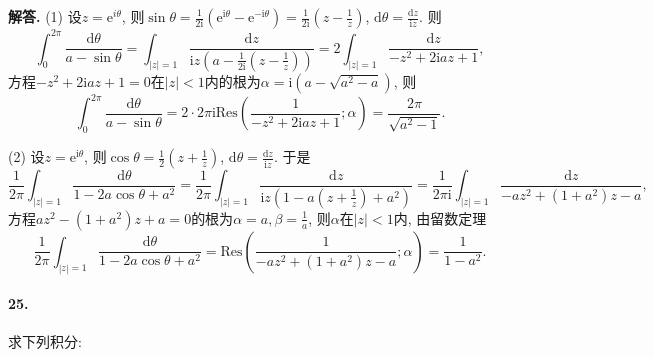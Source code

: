 \documentclass[12pt, a4paper, oneside]{ctexart}
\newenvironment{solution}{\par\noindent\textbf{解答. }}{\bigskip\par}
\def\res{\text{Res}}
\def\d{\mathrm{d}}      %
\def\e{\mathrm{e}}      %
\def\i{\mathrm{i}}      %
\def\add{\vspace{1ex}}  %
\begin{document}
\begin{solution}
    (1) 设$z = \e^{i\theta}$, 则$\sin\theta = \frac{1}{2\i}\left(\e^{\i\theta}-\e^{-\i\theta}\right) = \frac{1}{2\i}\left(z-\frac{1}{z}\right)$, $\d \theta = \frac{\d z}{\i z}$.
    则
    \begin{equation*}
        \int_{0}^{2\pi}\frac{\d\theta}{a-\sin\theta} =\int_{|z|=1}\frac{\d z}{\i z\left(a-\frac{1}{2\i}\left(z-\frac{1}{z}\right)\right)} = 2\int_{|z| = 1}\frac{\d z}{-z^2+2\i az+1},
    \end{equation*}
    方程$-z^2+2\i az+1=0$在$|z|<1$内的根为$\alpha = \i(a-\sqrt{a^2-a})$, 则
    \begin{equation*}
        \int_{0}^{2\pi}\frac{\d\theta}{a-\sin\theta} =2\cdot 2\pi\i\res\left(\frac{1}{-z^2+2\i az+1};\alpha\right) = \frac{2\pi}{\sqrt{a^2-1}}.
    \end{equation*}

    (2) 设$z=\e^{\i \theta}$, 则$\cos \theta = \frac{1}{2}\left(z+\frac{1}{z}\right)$, $\d\theta = \frac{\d z}{\i z}$. 于是
    \begin{equation*}
        \frac{1}{2\pi}\int_{|z| = 1}\frac{\d \theta}{1-2a\cos\theta+a^2} = \frac{1}{2\pi}\int_{|z|=1}\frac{\d z}{\i z\left(1-a\left(z+\frac{1}{z}\right)+a^2\right)} = \frac{1}{2\pi\i}\int_{|z|=1}\frac{\d z}{-az^2+(1+a^2)z-a},
    \end{equation*}
    方程$az^2-(1+a^2)z+a = 0$的根为$\alpha = a, \beta = \frac{1}{a}$, 则$\alpha$在$|z|<1$内, 由留数定理
    \begin{equation*}
        \frac{1}{2\pi}\int_{|z| = 1}\frac{\d \theta}{1-2a\cos\theta+a^2} = \res\left(\frac{1}{-az^2+(1+a^2)z-a};\alpha\right) = \frac{1}{1-a^2}.
    \end{equation*}
\end{solution}
\paragraph{25.}求下列积分:\add
\end{document}
